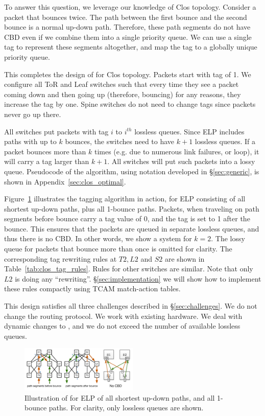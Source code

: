 To answer this question, we leverage our knowledge of Clos topology.  Consider a
packet that bounces twice. The path between the first bounce and the second
bounce is a normal up-down path. Therefore, these path segments do not have CBD
even if we combine them into a single priority queue. We can use a single tag to
represent these segments altogether, and map the tag to a globally unique
priority queue.

This completes the design of \sysname{} for Clos topology. Packets start with
tag of 1. We configure all ToR and Leaf switches such that every time they see
a packet coming down and then going up (therefore, bouncing) for any reasons,
they increase the tag by one. Spine switches do not need to change tags since 
packets never go up there.

All switches put packets with tag $i$ to $i^{th}$ lossless queues. Since ELP
includes paths with up to $k$ bounces, the switches need to have $k+1$ lossless
queues. If a packet bounces more than $k$ times (e.g. due to numerous link
failures, or loop), it will carry a tag larger than $k+1$. All switches will put
such packets into a lossy queue.  Pseudocode of the algorithm, using notation
developed in \S\ref{sec:generic}, is shown in Appendix~\ref{sec:clos_optimal}.

Figure~\ref{fig:clos_tagger} illustrates the tagging algorithm in action, for
ELP consisting of all shortest up-down paths, plus all 1-bounce paths.
Packets, when traveling on path segments before bounce carry a tag value of 0,
and the tag is set to 1 after the bounce. This ensures that the packets are
queued in separate lossless queues, and thus there is no CBD. In other words, we
show a system for $k=2$. The lossy queue for packets that bounce more than once
is omitted for clarity. The corresponding tag rewriting rules at  $T2, L2$ and
$S2$ are shown in Table~\ref{tab:clos_tag_rules}.  Rules for other switches are
similar. Note that only $L2$ is doing any ``rewriting''.
\S\ref{sec:implementation} we will show how to implement these rules compactly
using TCAM match-action tables.

This design satisfies all three challenges described in \S\ref{sec:challenges}.
We do not change the routing protocol. We work with existing hardware. We deal
with dynamic changes to , and we do not exceed the number of available
lossless queues.

\begin{figure}[t]
	\centering
	\includegraphics[width=0.5\textwidth] {figs/cbd_b}
	\caption{Illustration of \sysname{} for ELP of all shortest up-down paths,
		and all 1-bounce paths. For clarity, only lossless queues are shown.}
	\label{fig:clos_tagger}
\end{figure}

